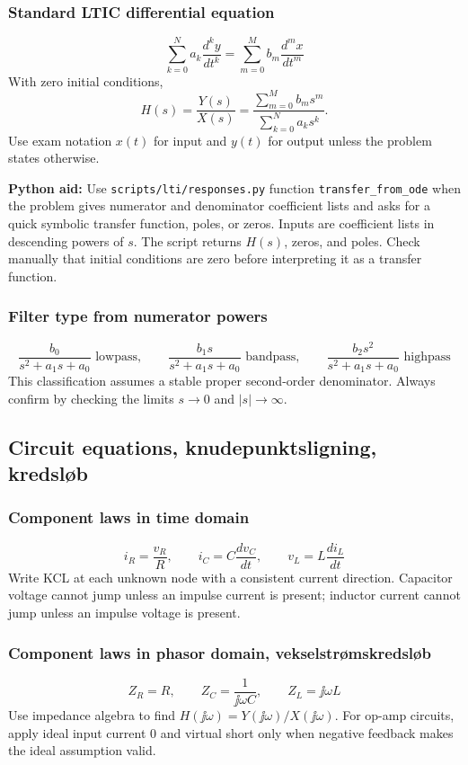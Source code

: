 \subsubsection{Standard LTIC differential equation}
\[
\sum_{k=0}^{N}a_k\frac{d^k y}{dt^k}
=
\sum_{m=0}^{M}b_m\frac{d^m x}{dt^m}
\]
With zero initial conditions,
\[
H(s)=\frac{Y(s)}{X(s)}
=
\frac{\sum_{m=0}^{M}b_m s^m}{\sum_{k=0}^{N}a_k s^k}.
\]
Use exam notation \(x(t)\) for input and \(y(t)\) for output unless the problem states otherwise.

\textbf{Python aid:} Use \texttt{scripts/lti/responses.py} function \texttt{transfer\_from\_ode} when the problem gives numerator and denominator coefficient lists and asks for a quick symbolic transfer function, poles, or zeros. Inputs are coefficient lists in descending powers of \(s\). The script returns \(H(s)\), zeros, and poles. Check manually that initial conditions are zero before interpreting it as a transfer function.

\subsubsection{Filter type from numerator powers}
\[
\frac{b_0}{s^2+a_1s+a_0}\text{ lowpass},\qquad
\frac{b_1s}{s^2+a_1s+a_0}\text{ bandpass},\qquad
\frac{b_2s^2}{s^2+a_1s+a_0}\text{ highpass}
\]
This classification assumes a stable proper second-order denominator. Always confirm by checking the limits \(s\to0\) and \(|s|\to\infty\).

\subsection{Circuit equations, knudepunktsligning, kredsløb}

\subsubsection{Component laws in time domain}
\[
i_R=\frac{v_R}{R},\qquad i_C=C\frac{dv_C}{dt},\qquad v_L=L\frac{di_L}{dt}
\]
Write KCL at each unknown node with a consistent current direction. Capacitor voltage cannot jump unless an impulse current is present; inductor current cannot jump unless an impulse voltage is present.

\subsubsection{Component laws in phasor domain, vekselstrømskredsløb}
\[
Z_R=R,\qquad Z_C=\frac{1}{\jj\omega C},\qquad Z_L=\jj\omega L
\]
Use impedance algebra to find \(H(\jj\omega)=Y(\jj\omega)/X(\jj\omega)\). For op-amp circuits, apply ideal input current \(0\) and virtual short only when negative feedback makes the ideal assumption valid.

